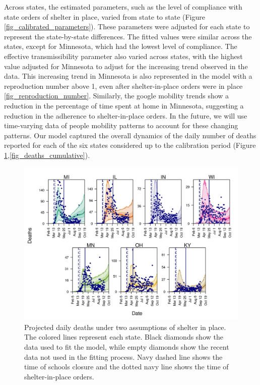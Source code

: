 \documentclass[11pt]{article}
\begin{document}
Across states, the estimated parameters, such as the level of compliance with state orders of shelter in place, varied from state to state (Figure \ref{fig_calibrated_parameters}). These parameters were adjusted for each state to represent the state-by-state differences. The fitted values were similar across the states, except for Minnesota, which had the lowest level of compliance. The effective transmissibility parameter also varied across states, with the highest value adjusted for Minnesota to adjust for the increasing trend observed in the data. This increasing trend in Minnesota is also represented in the model with a reproduction number above 1, even after shelter-in-place orders were in place \ref{fig_reproduction_number}. Similarly, the google mobility trends show a reduction in the percentage of time spent at home in Minnesota, suggesting a reduction in the adherence to shelter-in-place orders. In the future, we will use time-varying data of people mobility patterns to account for these changing patterns. Our model captured the overall dynamics of the daily number of deaths reported for each of the six states considered up to the calibration period (Figure \ref{fig_deaths_forecast},\ref{fig_deaths_cumulative}).


\begin{figure}[hb!]
\centering
\includegraphics[width=\textwidth]{../figures/report_figure_deaths_forecast.jpeg} 
\caption{\label{fig_deaths_forecast} Projected daily deaths under two assumptions of shelter in place. The colored lines represent each state. Black diamonds show the data used to fit the model, while empty diamonds show the recent data not used in the fitting process. Navy dashed line shows the time of schools closure and the dotted navy line shows the time of shelter-in-place orders.}
\end{figure}
\end{document}
